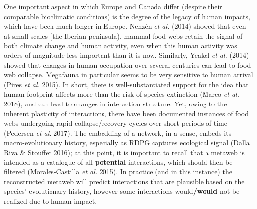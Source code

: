 \documentclass[11pt]{article}
\makeatletter
\def\maxwidth{\ifdim\Gin@nat@width>\linewidth\linewidth
\else\Gin@nat@width\fi}
\let\Oldincludegraphics\includegraphics
\renewcommand{\includegraphics}[1]{\Oldincludegraphics[width=\maxwidth]{#1}}
\providecommand{\DIFaddtex}[1]{{\bf #1}} %
\providecommand{\DIFdeltex}[1]{} %
\providecommand{\DIFaddbegin}{\protect\color{blue}} %
\providecommand{\DIFaddend}{\protect\color{black}} %
\providecommand{\DIFdelbegin}{\protect\color{red}} %
\providecommand{\DIFdelend}{\protect\color{black}} %
\providecommand{\DIFadd}[1]{\texorpdfstring{\DIFaddtex{#1}}{#1}} %
\providecommand{\DIFdel}[1]{\texorpdfstring{\DIFdeltex{#1}}{}} %
\newcommand{\DIFscaledelfig}{0.5}
\newlength{\DIFdelgraphicswidth} %
\newlength{\DIFdelgraphicsheight} %
\newcommand{\DIFaddincludegraphics}[2][]{{\color{blue}\fbox{\DIFOincludegraphics[#1]{#2}}}} %
\newcommand{\DIFdelincludegraphics}[2][]{%
\sbox{\DIFdelgraphicsbox}{\DIFOincludegraphics[#1]{#2}}%
\settoboxwidth{\DIFdelgraphicswidth}{\DIFdelgraphicsbox} %
\settoboxtotalheight{\DIFdelgraphicsheight}{\DIFdelgraphicsbox} %
\scalebox{\DIFscaledelfig}{%
\parbox[b]{\DIFdelgraphicswidth}{\usebox{\DIFdelgraphicsbox}\\[-\baselineskip] \rule{\DIFdelgraphicswidth}{0em}}\llap{\resizebox{\DIFdelgraphicswidth}{\DIFdelgraphicsheight}{%
\setlength{\unitlength}{\DIFdelgraphicswidth}%
\begin{picture}(1,1)%
\thicklines\linethickness{2pt} %
{\color[rgb]{1,0,0}\put(0,0){\framebox(1,1){}}}%
{\color[rgb]{1,0,0}\put(0,0){\line( 1,1){1}}}%
{\color[rgb]{1,0,0}\put(0,1){\line(1,-1){1}}}%
\end{picture}%
}\hspace*{3pt}}} %
} %
\DeclareRobustCommand{\DIFaddbegin}{\DIFOaddbegin \let\includegraphics\DIFaddincludegraphics} %
\DeclareRobustCommand{\DIFaddend}{\DIFOaddend \let\includegraphics\DIFOincludegraphics} %
\DeclareRobustCommand{\DIFdelbegin}{\DIFOdelbegin \let\includegraphics\DIFdelincludegraphics} %
\DeclareRobustCommand{\DIFdelend}{\DIFOaddend \let\includegraphics\DIFOincludegraphics} %
\makeatother
\begin{document}
One important aspect in which Europe and Canada differ (despite their
comparable bioclimatic conditions) is the degree of the legacy of human
impacts, which have been much longer in Europe. Nenzén \emph{et al.}
(2014) showed that even at small scales (the Iberian peninsula), mammal
food webs retain the signal of both climate change and human activity,
even when this human activity was orders of magnitude less important
than it is now. Similarly, Yeakel \emph{et al.} (2014) showed that
changes in human occupation over several centuries can lead to food web
collapse. Megafauna in particular seems to be very sensitive to human
arrival (Pires \emph{et al.} 2015). In short, there is
well-substantiated support for the idea that human footprint affects
more than the risk of species extinction (Marco \emph{et al.} 2018), and
can lead to changes in interaction structure. Yet, owing to the inherent
plasticity of interactions, there have been documented instances of food
webs undergoing rapid collapse/recovery cycles over short periods of
time (Pedersen \emph{et al.} 2017). The embedding of a network, in a
sense, embeds its macro-evolutionary history, especially as RDPG
captures ecological signal (Dalla Riva \& Stouffer 2016); at this point,
it is important to recall that a metaweb is intended as a catalogue of
all \DIFdelbegin \DIFdel{possible }\DIFdelend \DIFaddbegin \DIFadd{potential }\DIFaddend interactions, which should then be filtered
(Morales-Castilla \emph{et al.} 2015). In practice (and in this
instance) the reconstructed metaweb will predict interactions that are
plausible based on the species' evolutionary history, however some
interactions would\DIFaddbegin \DIFadd{/would }\DIFaddend not be realized due to human impact.
\end{document}
